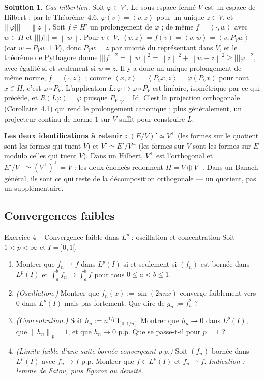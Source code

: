 \documentclass[11pt,a4paper]{article}
\newcommand{\norm}[1]{\left\|#1\right\|}
\newcommand{\opnorm}[1]{|\!|\!|#1|\!|\!|}
\newcommand{\ps}[2]{\left\langle #1,#2\right\rangle}
\newcommand{\wk}{\rightharpoonup}
\theoremstyle{definition}
\newtheorem*{solution}{Solution}
\begin{document}
\begin{solution}
\emph{Cas hilbertien.} Soit $\varphi\in V'$. Le sous-espace fermé $V$ est un espace de Hilbert : par le Théorème~4.6, $\varphi(v)=\ps vz$ pour un unique $z\in V$, et $\opnorm\varphi=\norm z$. Soit $f\in H'$ un prolongement de $\varphi$ ; de même $f=\ps\cdot w$ avec $w\in H$ et $\opnorm f=\norm w$. Pour $v\in V$, $\ps vz=f(v)=\ps vw=\ps v{P_Vw}$ (car $w-P_Vw\perp V$), donc $P_Vw=z$ par unicité du représentant dans $V$, et le théorème de Pythagore donne $\opnorm f^2=\norm w^2=\norm z^2+\norm{w-z}^2\ge\opnorm\varphi^2$, avec égalité si et seulement si $w=z$. Il y a donc un unique prolongement de même norme, $f=\ps\cdot z$ ; comme $\ps xz=\ps{P_Vx}z=\varphi(P_Vx)$ pour tout $x\in H$, c'est $\varphi\circ P_V$. L'application $L:\varphi\mapsto\varphi\circ P_V$ est linéaire, isométrique par ce qui précède, et $R(L\varphi)=\varphi$ puisque $P_V|_V=\mathrm{Id}$. C'est la projection orthogonale (Corollaire~4.1) qui rend le prolongement canonique ; plus généralement, un projecteur continu de norme $1$ sur $V$ suffit pour construire $L$.
\end{solution}

\begin{pointcle}
\textbf{Les deux identifications à retenir :} $(E/V)'\simeq V^\perp$ (les formes sur le quotient sont les formes qui tuent $V$) et $V'\simeq E'/V^\perp$ (les formes sur $V$ sont les formes sur $E$ modulo celles qui tuent $V$). Dans un Hilbert, $V^\perp$ est l'orthogonal et $E'/V^\perp\simeq(V^\perp)^\perp=V$ : les deux énoncés redonnent $H=V\oplus V^\perp$. Dans un Banach général, ils sont ce qui reste de la décomposition orthogonale — un quotient, pas un supplémentaire.
\end{pointcle}

\subsection*{Convergences faibles}

\begin{exo}{Exercice 4 -- Convergence faible dans $L^p$ : oscillation et concentration}
Soit $1<p<\infty$ et $I=]0,1[$.
\begin{enumerate}[label=(\alph*)]
  \item Montrer que $f_n\wk f$ dans $L^p(I)$ si et seulement si $(f_n)$ est bornée dans $L^p(I)$ et $\int_a^bf_n\to\int_a^bf$ pour tous $0\le a<b\le1$.
  \item \emph{(Oscillation.)} Montrer que $f_n(x):=\sin(2\pi nx)$ converge faiblement vers $0$ dans $L^p(I)$ mais pas fortement. Que dire de $g_n:=f_n^2$ ?
  \item \emph{(Concentration.)} Soit $h_n:=n^{1/p}\mathbf 1_{]0,1/n[}$. Montrer que $h_n\wk0$ dans $L^p(I)$, que $\norm{h_n}_p=1$, et que $h_n\to0$ p.p. Que se passe-t-il pour $p=1$ ?
  \item \emph{(Limite faible d'une suite bornée convergeant p.p.)} Soit $(f_n)$ bornée dans $L^p(I)$ avec $f_n\to f$ p.p. Montrer que $f\in L^p(I)$ et $f_n\wk f$. \emph{Indication : lemme de Fatou, puis Egorov ou densité.}
\end{enumerate}
\end{exo}
\end{document}

